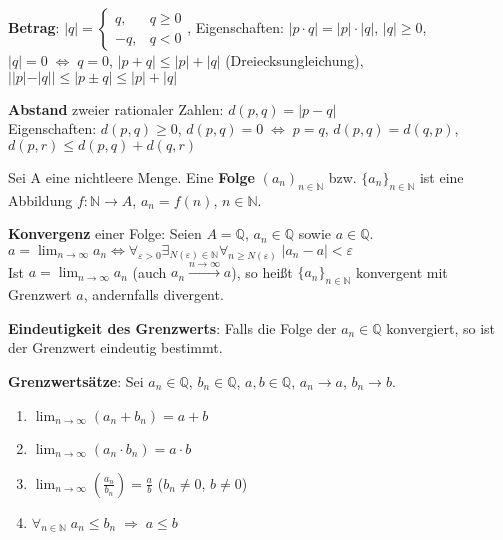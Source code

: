 \textbf{Betrag}:
$|q| = \begin{cases} q, & q \ge 0 \\ -q, & q < 0 \end{cases}$, \quad
Eigenschaften: $|p \cdot q| = |p| \cdot |q|$, \quad $|q| \ge 0$, \quad
$|q| = 0 \;\Leftrightarrow\; q = 0$,
$|p + q| \le |p| + |q|$ (Dreiecksungleichung), \quad
$||p| - |q|| \le |p \pm q| \le |p| + |q|$

\textbf{Abstand} zweier rationaler Zahlen:
$d(p, q) = |p - q|$ \\
Eigenschaften:
$d(p, q) \ge 0$, \;\;
$d(p, q) = 0 \;\Leftrightarrow\; p = q$, \;\;
$d(p, q) = d(q, p)$, \;\;
$d(p, r) \le d(p, q) + d(q, r)$

\linie

Sei A eine nichtleere Menge. Eine \textbf{Folge} $(a_n)_{n \in \mathbb{N}}$
bzw. $\{a_n\}_{n \in \mathbb{N}}$ ist eine Abbildung
$f: \mathbb{N} \rightarrow A$, $a_n = f(n)$, $n \in \mathbb{N}$.

\textbf{Konvergenz} einer Folge: Seien $A = \mathbb{Q}$, $a_n \in \mathbb{Q}$
sowie $a \in \mathbb{Q}$. \\
$a = \lim_{n \to \infty} a_n \Leftrightarrow
\forall_{\varepsilon > 0} \exists_{N(\varepsilon) \in \mathbb{N}}
\forall_{n \ge N(\varepsilon)}\; |a_n - a| < \varepsilon$ \\
Ist $a = \lim_{n \to \infty} a_n$ (auch $a_n \xrightarrow{n \to \infty} a$),
so heißt $\{a_n\}_{n \in \mathbb{N}}$ konvergent mit Grenzwert $a$, andernfalls
divergent.

\textbf{Eindeutigkeit des Grenzwerts}: Falls die Folge der $a_n \in \mathbb{Q}$
konvergiert, so ist der Grenzwert eindeutig bestimmt.

\textbf{Grenzwertsätze}: Sei $a_n \in \mathbb{Q}$, $b_n \in \mathbb{Q}$,
$a, b \in \mathbb{Q}$, $a_n \to a$, $b_n \to b$.

\begin{enumerate}
    \item $\lim_{n \to \infty} (a_n + b_n) = a + b$
    
    \item $\lim_{n \to \infty} (a_n \cdot b_n) = a \cdot b$
    
    \item $\lim_{n \to \infty} (\frac{a_n}{b_n}) = \frac{a}{b}$ \quad
    ($b_n \not= 0$, $b \not= 0$)
    
    \item $\forall_{n \in \mathbb{N}}\; a_n \le b_n \;\Rightarrow\; a \le b$
\end{enumerate}

